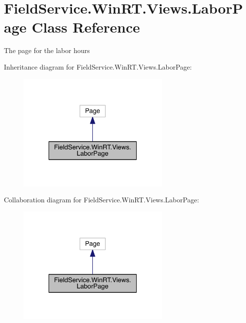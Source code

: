\hypertarget{class_field_service_1_1_win_r_t_1_1_views_1_1_labor_page}{\section{Field\+Service.\+Win\+R\+T.\+Views.\+Labor\+Page Class Reference}
\label{class_field_service_1_1_win_r_t_1_1_views_1_1_labor_page}
}


The page for the labor hours  




Inheritance diagram for Field\+Service.\+Win\+R\+T.\+Views.\+Labor\+Page\+:
\nopagebreak
\begin{figure}[H]
\begin{center}
\leavevmode
\includegraphics[width=214pt]{class_field_service_1_1_win_r_t_1_1_views_1_1_labor_page__inherit__graph}
\end{center}
\end{figure}


Collaboration diagram for Field\+Service.\+Win\+R\+T.\+Views.\+Labor\+Page\+:
\nopagebreak
\begin{figure}[H]
\begin{center}
\leavevmode
\includegraphics[width=214pt]{class_field_service_1_1_win_r_t_1_1_views_1_1_labor_page__coll__graph}
\end{center}
\end{figure}
